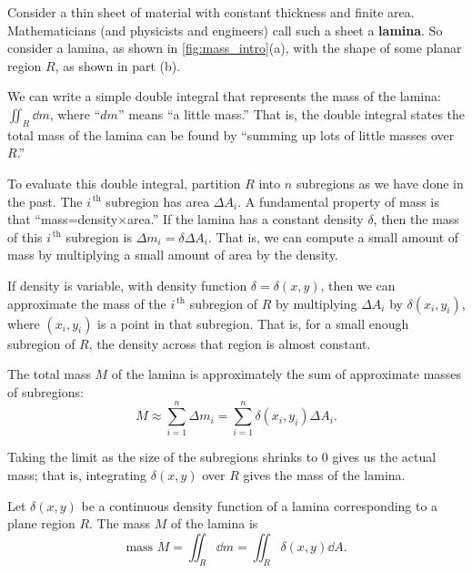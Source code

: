 Consider a thin sheet of material with constant thickness and finite area. Mathematicians (and physicists and engineers) call such a sheet a \textbf{lamina}. So consider a lamina, as shown in \autoref{fig:mass_intro}(a),  with the shape of some planar region $R$, as shown in part (b).

We can write a simple double integral that represents the mass of the lamina: $\iint_R\dd m$, where ``$dm$'' means ``a little mass.'' That is, the double integral states the total mass of the lamina can be found by ``summing up lots of little masses over $R$.''

To evaluate this double integral, partition $R$ into $n$ subregions as we have done in the past. The $i^{\,\text{th}}$ subregion has area $\Delta A_i$. 
A fundamental property of mass is that ``mass=density$\times$area.'' If the lamina has a constant density $\delta$, then the mass of this $i^{\,\text{th}}$ subregion is $\Delta m_i=\delta\Delta A_i$. %
That is, we can compute a small amount of mass by multiplying a small amount of area by the density.

If density is variable, with density function $\delta= \delta(x,y)$, then we can approximate the mass of the $i^{\,\text{th}}$ subregion of $R$ by multiplying $\Delta A_i$ by $\delta(x_i,y_i)$, where $(x_i,y_i)$ is a point in that subregion. That is, for a small enough subregion of $R$, the density across that region is almost constant. 


The total mass $M$ of the lamina is approximately the sum of approximate masses of subregions:
\[M \approx \sum_{i=1}^n \Delta m_i = \sum_{i=1}^n \delta(x_i,y_i)\Delta A_i.\]

Taking the limit as the size of the subregions shrinks to 0 gives us the actual mass; that is, integrating $\delta(x,y)$ over $R$ gives the mass of the lamina.

\begin{definition}\label{def:mass}%
Let $\delta(x,y)$ be a continuous density function of a lamina corresponding to a plane region $R$. The mass $M$ of the lamina is
\[\text{mass } M = \iint_R\dd m = \iint_R \delta(x,y)\dd A.\]
\end{definition}

